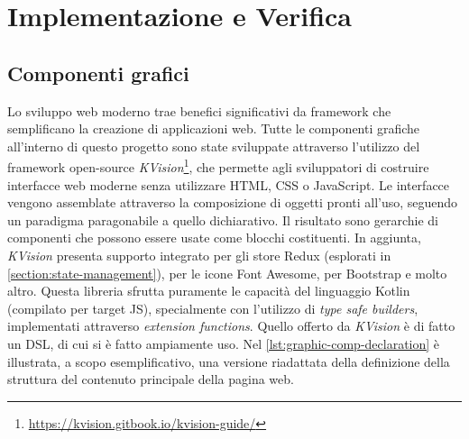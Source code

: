 \chapter{Implementazione e Verifica}

\section{Componenti grafici}
Lo sviluppo web moderno trae benefici significativi da framework che semplificano la creazione di applicazioni web. Tutte le componenti grafiche all'interno di questo progetto sono state sviluppate attraverso l'utilizzo del framework open-source \textit{KVision}\footnote{\url{https://kvision.gitbook.io/kvision-guide/}}, che permette agli sviluppatori di costruire interfacce web moderne senza utilizzare HTML, CSS o JavaScript. Le interfacce vengono assemblate attraverso la composizione di oggetti pronti all'uso, seguendo un paradigma paragonabile a quello dichiarativo. Il risultato sono gerarchie di componenti che possono essere usate come blocchi costituenti. In aggiunta, \textit{KVision} presenta supporto integrato per gli store Redux (esplorati in \cref{section:state-management}), per le icone Font Awesome, per Bootstrap e molto altro. Questa libreria sfrutta puramente le capacità del linguaggio Kotlin (compilato per target JS), specialmente con l'utilizzo di \textit{type safe builders}, implementati attraverso \textit{extension functions}. Quello offerto da \textit{KVision} è di fatto un \ac{DSL}, di cui si è fatto ampiamente uso.
Nel \cref{lst:graphic-comp-declaration} è illustrata, a scopo esemplificativo, una versione riadattata della definizione della struttura del contenuto principale della pagina web.



